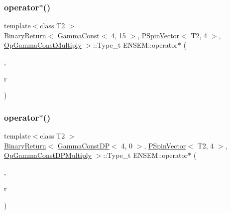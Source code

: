 \subsubsection{\texorpdfstring{operator$\ast$()}{operator*()}\hspace{0.1cm}{\footnotesize\ttfamily [16/32]}}
{\footnotesize\ttfamily template$<$class T2 $>$ \\
\mbox{\hyperlink{structENSEM_1_1BinaryReturn}{Binary\+Return}}$<$ \mbox{\hyperlink{classENSEM_1_1GammaConst}{Gamma\+Const}}$<$ 4, 15 $>$, \mbox{\hyperlink{classENSEM_1_1PSpinVector}{P\+Spin\+Vector}}$<$ T2, 4 $>$, \mbox{\hyperlink{structENSEM_1_1OpGammaConstMultiply}{Op\+Gamma\+Const\+Multiply}} $>$\+::Type\+\_\+t E\+N\+S\+E\+M\+::operator$\ast$ (\begin{DoxyParamCaption}\item[{const \mbox{\hyperlink{classENSEM_1_1GammaConst}{Gamma\+Const}}$<$ 4, 15 $>$ \&}]{,  }\item[{const \mbox{\hyperlink{classENSEM_1_1PSpinVector}{P\+Spin\+Vector}}$<$ T2, 4 $>$ \&}]{r }\end{DoxyParamCaption})\hspace{0.3cm}{\ttfamily [inline]}}

\mbox{\label{group__primspinvector_ga90d081a5379c410e3a2225ba98128415}} 
\subsubsection{\texorpdfstring{operator$\ast$()}{operator*()}\hspace{0.1cm}{\footnotesize\ttfamily [17/32]}}
{\footnotesize\ttfamily template$<$class T2 $>$ \\
\mbox{\hyperlink{structENSEM_1_1BinaryReturn}{Binary\+Return}}$<$ \mbox{\hyperlink{classENSEM_1_1GammaConstDP}{Gamma\+Const\+DP}}$<$ 4, 0 $>$, \mbox{\hyperlink{classENSEM_1_1PSpinVector}{P\+Spin\+Vector}}$<$ T2, 4 $>$, \mbox{\hyperlink{structENSEM_1_1OpGammaConstDPMultiply}{Op\+Gamma\+Const\+D\+P\+Multiply}} $>$\+::Type\+\_\+t E\+N\+S\+E\+M\+::operator$\ast$ (\begin{DoxyParamCaption}\item[{const \mbox{\hyperlink{classENSEM_1_1GammaConstDP}{Gamma\+Const\+DP}}$<$ 4, 0 $>$ \&}]{,  }\item[{const \mbox{\hyperlink{classENSEM_1_1PSpinVector}{P\+Spin\+Vector}}$<$ T2, 4 $>$ \&}]{r }\end{DoxyParamCaption})\hspace{0.3cm}{\ttfamily [inline]}}


